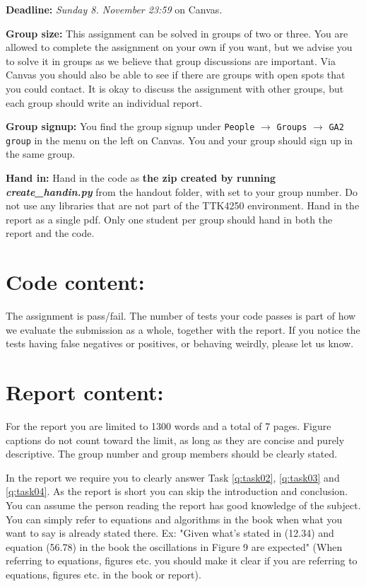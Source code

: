 \documentclass{exam}
\begin{document}
{\bf Deadline:} \emph{Sunday {8}. November 23:59} on Canvas.

\textbf{Group size:} This assignment can be solved in groups of two or three. You are allowed to complete the assignment on your own if you want, but we advise you to solve it in groups as we believe that group discussions are important. Via Canvas you should also be able to see if there are groups with open spots that you could contact. It is okay to discuss the assignment with other groups, but each group should write an individual report.

\textbf{Group signup:} You find the group signup under \texttt{People} $\rightarrow$ \texttt{Groups} $\rightarrow$ \texttt{GA2 group} in the menu on the left on Canvas. You and your group should sign up in the same group.

\textbf{Hand in:} Hand in the code as \textbf{the zip created by running \textit{create\_handin.py}} from the handout folder, with  set to your group number. Do not use any libraries that are not part of the TTK4250 environment.
Hand in the report as a single pdf.
Only one student per group should hand in both the report and the code.

\section*{Code content:}
The assignment is pass/fail. The number of tests your code passes is part of how we evaluate the submission as a whole, together with the report.
If you notice the tests having false negatives or positives, or behaving weirdly, please let us know.

\section*{Report content:}
For the report you are limited to 1300 words and a total of 7 pages. Figure captions do not count toward the limit, as long as they are concise and purely descriptive. The group number and group members should be clearly stated.

In the report we require you to clearly answer Task \ref{q:task02}, \ref{q:task03} and \ref{q:task04}. As the report is short you can skip the introduction and conclusion.
You can assume the person reading the report has good knowledge of the subject.
You can simply refer to equations and algorithms in the book when what you want to say is already stated there.
Ex: "Given what's stated in (12.34) and equation (56.78) in the book the oscillations in Figure 9 are expected" (When referring to equations, figures etc. you should make it clear if you are referring to equations, figures etc. in the book or report).
\end{document}
